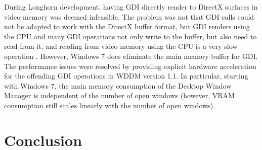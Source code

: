 			During Longhorn development, having GDI directly render to DirectX
			surfaces in video memory was deemed infeasible. The problem
			was not that GDI calls
			could not be adapted to work with the DirectX buffer format, but
			GDI renders using the CPU and many GDI operations not only write to
			the buffer, but also need to read from it, and reading from video memory
			using the CPU is a very slow operation \cite{dwmredirect}. However,
			Windows 7 does eliminate the main memory buffer for GDI. The performance
			issues were resolved by providing explicit hardware acceleration for
			the offending GDI operations in WDDM version 1.1. In particular,
			starting with Windows 7, the
			main memory consumption of the Desktop Window Manager is independent
			of the number of open windows (however, VRAM consumption still scales
			linearly with the number of open windows).
			\cite{win7}

	\section{Conclusion}

	\onecolumn{\printbibliography}

